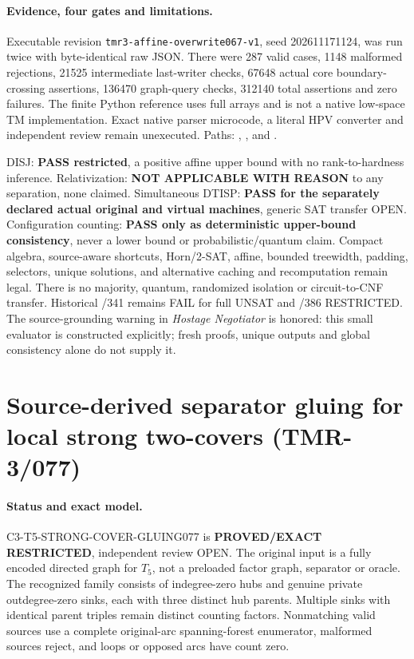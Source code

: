 \documentclass[11pt]{article}
\begin{document}
\paragraph{Evidence, four gates and limitations.}
Executable revision \texttt{tmr3-affine-overwrite067-v1}, seed
202611171124, was run twice with byte-identical raw JSON.
There were 287 valid cases, 1148 malformed rejections,
21525 intermediate last-writer checks, 67648 actual core
boundary-crossing assertions, 136470 graph-query checks,
312140 total assertions and zero failures.
The finite Python reference uses full arrays and is not a
native low-space TM implementation. Exact native parser
microcode, a literal HPV converter and independent review
remain unexecuted. Paths:
,
, and
.

DISJ: \textbf{PASS restricted}, a positive affine upper bound with
no rank-to-hardness inference. Relativization:
\textbf{NOT APPLICABLE WITH REASON} to any separation, none claimed.
Simultaneous DTISP: \textbf{PASS for the separately declared actual
original and virtual machines}, generic SAT transfer OPEN.
Configuration counting: \textbf{PASS only as deterministic upper-bound
consistency}, never a lower bound or probabilistic/quantum claim.
Compact algebra, source-aware shortcuts, Horn/2-SAT, affine,
bounded treewidth, padding, selectors, unique solutions, and
alternative caching and recomputation remain legal. There is no
majority, quantum, randomized isolation or circuit-to-CNF transfer.
Historical /341 remains FAIL for full UNSAT and /386 RESTRICTED.
The source-grounding warning in \emph{Hostage Negotiator} is honored:
this small evaluator is constructed explicitly; fresh proofs,
unique outputs and global consistency alone do not supply it.


\section{Source-derived separator gluing for local strong two-covers (TMR-3/077)}

\paragraph{Status and exact model.}
\textsc{C3-T5-STRONG-COVER-GLUING077} is \textbf{PROVED/EXACT
RESTRICTED}, independent review OPEN. The original input is a fully
encoded directed graph for $T_5$, not a preloaded factor graph,
separator or oracle. The recognized family consists of indegree-zero
hubs and genuine private outdegree-zero sinks, each with three
distinct hub parents. Multiple sinks with identical parent triples
remain distinct counting factors. Nonmatching valid sources use
a complete original-arc spanning-forest enumerator, malformed
sources reject, and loops or opposed arcs have count zero.
\end{document}
